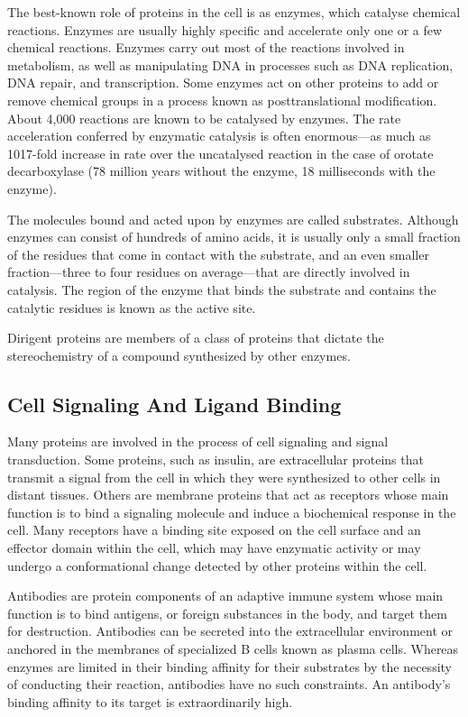The best-known role of proteins in the cell is as enzymes, which catalyse chemical reactions. Enzymes are usually highly specific and accelerate only one or a few chemical reactions. Enzymes carry out most of the reactions involved in metabolism, as well as manipulating DNA in processes such as DNA replication, DNA repair, and transcription. Some enzymes act on other proteins to add or remove chemical groups in a process known as posttranslational modification. About 4,000 reactions are known to be catalysed by enzymes. The rate acceleration conferred by enzymatic catalysis is often enormous---as much as 1017-fold increase in rate over the uncatalysed reaction in the case of orotate decarboxylase (78 million years without the enzyme, 18 milliseconds with the enzyme).

The molecules bound and acted upon by enzymes are called substrates. Although enzymes can consist of hundreds of amino acids, it is usually only a small fraction of the residues that come in contact with the substrate, and an even smaller fraction---three to four residues on average---that are directly involved in catalysis. The region of the enzyme that binds the substrate and contains the catalytic residues is known as the active site.

Dirigent proteins are members of a class of proteins that dictate the stereochemistry of a compound synthesized by other enzymes.

\hypertarget{cell-signaling-and-ligand-binding}{%
\subsection{Cell Signaling And Ligand Binding}\label{cell-signaling-and-ligand-binding}}

Many proteins are involved in the process of cell signaling and signal transduction. Some proteins, such as insulin, are extracellular proteins that transmit a signal from the cell in which they were synthesized to other cells in distant tissues. Others are membrane proteins that act as receptors whose main function is to bind a signaling molecule and induce a biochemical response in the cell. Many receptors have a binding site exposed on the cell surface and an effector domain within the cell, which may have enzymatic activity or may undergo a conformational change detected by other proteins within the cell.

Antibodies are protein components of an adaptive immune system whose main function is to bind antigens, or foreign substances in the body, and target them for destruction. Antibodies can be secreted into the extracellular environment or anchored in the membranes of specialized B cells known as plasma cells. Whereas enzymes are limited in their binding affinity for their substrates by the necessity of conducting their reaction, antibodies have no such constraints. An antibody's binding affinity to its target is extraordinarily high.

